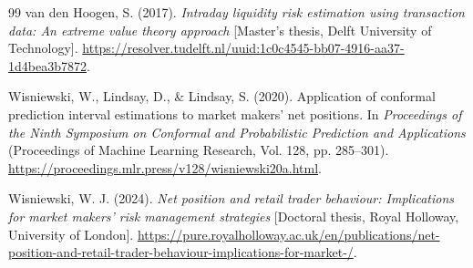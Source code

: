 \begin{thebibliography}{99}
 van den Hoogen, S. (2017). \emph{Intraday liquidity risk estimation using transaction data: An extreme value theory approach} [Master's thesis, Delft University of Technology]. \url{https://resolver.tudelft.nl/uuid:1c0c4545-bb07-4916-aa37-1d4bea3b7872}.

 Wisniewski, W., Lindsay, D., \& Lindsay, S. (2020). Application of conformal prediction interval estimations to market makers' net positions. In \emph{Proceedings of the Ninth Symposium on Conformal and Probabilistic Prediction and Applications} (Proceedings of Machine Learning Research, Vol. 128, pp. 285--301). \url{https://proceedings.mlr.press/v128/wisniewski20a.html}.

 Wisniewski, W. J. (2024). \emph{Net position and retail trader behaviour: Implications for market makers' risk management strategies} [Doctoral thesis, Royal Holloway, University of London]. \url{https://pure.royalholloway.ac.uk/en/publications/net-position-and-retail-trader-behaviour-implications-for-market-/}.
\end{thebibliography}
